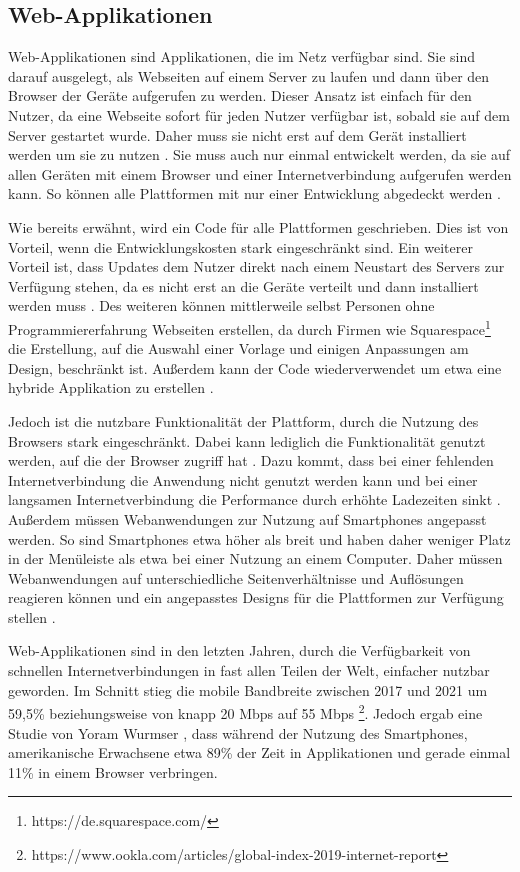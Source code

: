 \subsection{Web-Applikationen}
Web-Applikationen sind Applikationen, die im Netz verfügbar sind. Sie sind darauf ausgelegt, als Webseiten auf einem Server zu laufen und dann über den Browser der Geräte aufgerufen zu werden. Dieser Ansatz ist einfach für den Nutzer, da eine Webseite sofort für jeden Nutzer verfügbar ist, sobald sie auf dem Server gestartet wurde. Daher muss sie nicht erst auf dem Gerät installiert werden um sie zu nutzen \cite{IEEE_Khackouch_Al}. Sie muss auch nur einmal entwickelt werden, da sie auf allen Geräten mit einem Browser und einer Internetverbindung aufgerufen werden kann. So können alle Plattformen mit nur einer Entwicklung abgedeckt werden \cite{IEEE_development_classes}.

Wie bereits erwähnt, wird ein Code für alle Plattformen geschrieben. Dies ist von Vorteil, wenn die Entwicklungskosten stark eingeschränkt sind. Ein weiterer Vorteil ist, dass Updates dem Nutzer direkt nach einem Neustart des Servers zur Verfügung stehen, da es nicht erst an die Geräte verteilt und dann installiert werden muss \cite{IEEE_Khackouch_Al}. Des weiteren können mittlerweile selbst Personen ohne Programmiererfahrung Webseiten erstellen, da durch Firmen wie Squarespace\footnote{https://de.squarespace.com/} die Erstellung, auf die Auswahl einer Vorlage und einigen Anpassungen am Design, beschränkt ist. 
Außerdem kann der Code wiederverwendet um etwa eine hybride Applikation zu erstellen \cite{IEEE_Khackouch_Al}.  

Jedoch ist die nutzbare Funktionalität der Plattform, durch die Nutzung des Browsers stark eingeschränkt. Dabei kann lediglich die Funktionalität genutzt werden, auf die der Browser zugriff hat \cite{Phyo}. Dazu kommt, dass bei einer fehlenden Internetverbindung die Anwendung nicht genutzt werden kann und bei einer langsamen Internetverbindung die Performance durch erhöhte Ladezeiten sinkt \cite{IEEE_Khackouch_Al}. Außerdem müssen Webanwendungen zur Nutzung auf Smartphones angepasst werden. So sind Smartphones etwa höher als breit und haben daher weniger Platz in der Menüleiste als etwa bei einer Nutzung an einem Computer. Daher müssen Webanwendungen auf unterschiedliche Seitenverhältnisse und Auflösungen reagieren können und ein angepasstes Designs für die Plattformen zur Verfügung stellen \cite{Serrano_mobile}.

Web-Applikationen sind in den letzten Jahren, durch die Verfügbarkeit von schnellen Internetverbindungen in fast allen Teilen der Welt, einfacher nutzbar geworden.
Im Schnitt stieg die mobile Bandbreite zwischen 2017 und 2021 um 59,5\% beziehungsweise von knapp 20 Mbps auf 55 Mbps \footnote{https://www.ookla.com/articles/global-index-2019-internet-report}.
Jedoch ergab eine Studie von Yoram Wurmser \cite{report_webusage}, dass während der Nutzung des Smartphones, amerikanische Erwachsene etwa 89\% der Zeit in Applikationen und gerade einmal 11\% in einem Browser verbringen.

